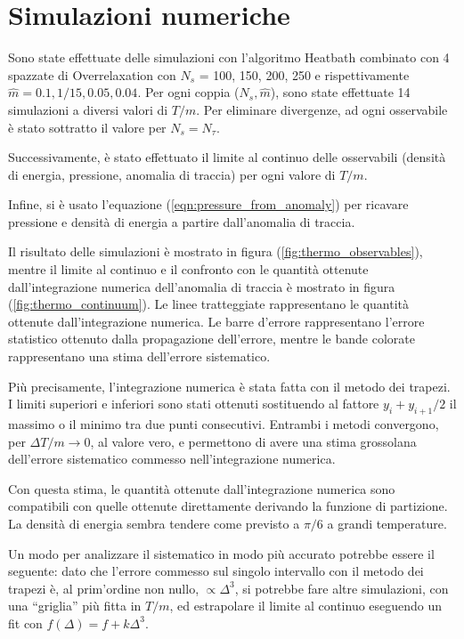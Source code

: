 \documentclass[a4paper,11pt]{article}
\begin{document}
    
    \section{Simulazioni numeriche}
    
    Sono state effettuate delle simulazioni con l'algoritmo Heatbath combinato con 4 spazzate di Overrelaxation con $N_s$ = 100, 150, 200, 250 e rispettivamente $\hat{m} = 0.1, 1/15, 0.05, 0.04$. Per ogni coppia ($N_s, \hat{m}$), sono state effettuate 14 simulazioni a diversi valori di $T/m$. Per eliminare divergenze, ad ogni osservabile è stato sottratto il valore per $N_s = N_\tau$.
    
    Successivamente, è stato effettuato il limite al continuo delle osservabili (densità di energia, pressione, anomalia di traccia) per ogni valore di $T/m$. 
    
    Infine, si è usato l'equazione (\ref{eqn:pressure_from_anomaly}) per ricavare pressione e densità di energia a partire dall'anomalia di traccia.
    
    Il risultato delle simulazioni è mostrato in figura (\ref{fig:thermo_observables}), mentre il limite al continuo e il confronto con le quantità ottenute dall'integrazione numerica dell'anomalia di traccia è mostrato in figura (\ref{fig:thermo_continuum}). Le linee tratteggiate rappresentano le quantità ottenute dall'integrazione numerica. Le barre d'errore rappresentano l'errore statistico ottenuto dalla propagazione dell'errore, mentre le bande colorate rappresentano una stima dell'errore sistematico.
    
    Più precisamente, l'integrazione numerica è stata fatta con il metodo dei trapezi. I limiti superiori e inferiori sono stati ottenuti sostituendo al fattore $y_i + y_{i+1} / 2$ il massimo o il minimo tra due punti consecutivi. Entrambi i metodi convergono, per $\Delta T/m \to 0$, al valore vero, e permettono di avere una stima grossolana dell'errore sistematico commesso nell'integrazione numerica.
    
    Con questa stima, le quantità ottenute dall'integrazione numerica sono compatibili con quelle ottenute direttamente derivando la funzione di partizione. La densità di energia sembra tendere come previsto a $\pi / 6$ a grandi temperature. 
    
    Un modo per analizzare il sistematico in modo più accurato potrebbe essere il seguente: dato che l'errore commesso sul singolo intervallo con il metodo dei trapezi è, al prim'ordine non nullo, $\propto \Delta^3$, si potrebbe fare altre simulazioni, con una ``griglia'' più fitta in $T/m$, ed estrapolare il limite al continuo eseguendo un fit con $f(\Delta) = f + k \Delta^3$.
    
\end{document}
